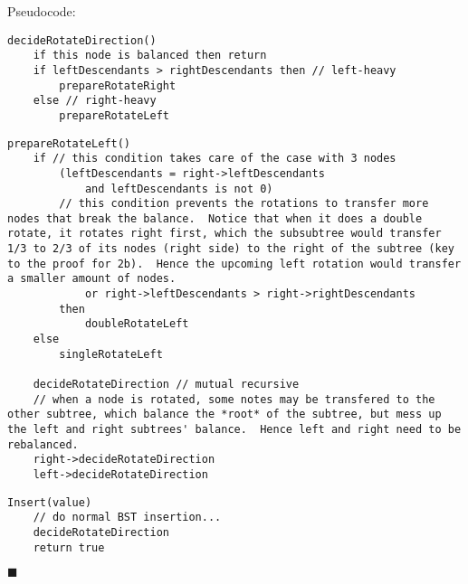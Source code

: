 \documentclass[12pt]{article}
\begin{document}
Pseudocode:
\begin{lstlisting}
decideRotateDirection()
	if this node is balanced then return
	if leftDescendants > rightDescendants then // left-heavy
		prepareRotateRight
	else // right-heavy
		prepareRotateLeft
\end{lstlisting}

\begin{lstlisting}
prepareRotateLeft()
	if // this condition takes care of the case with 3 nodes
		(leftDescendants = right->leftDescendants
			and leftDescendants is not 0)
		// this condition prevents the rotations to transfer more nodes that break the balance.  Notice that when it does a double rotate, it rotates right first, which the subsubtree would transfer 1/3 to 2/3 of its nodes (right side) to the right of the subtree (key to the proof for 2b).  Hence the upcoming left rotation would transfer a smaller amount of nodes.
			or right->leftDescendants > right->rightDescendants
		then
			doubleRotateLeft
	else
		singleRotateLeft

	decideRotateDirection // mutual recursive
	// when a node is rotated, some notes may be transfered to the other subtree, which balance the *root* of the subtree, but mess up the left and right subtrees' balance.  Hence left and right need to be rebalanced.
	right->decideRotateDirection
	left->decideRotateDirection
\end{lstlisting}

\begin{lstlisting}
Insert(value)
	// do normal BST insertion...
	decideRotateDirection
	return true
\end{lstlisting}

\hfill $\blacksquare$
\end{document}
